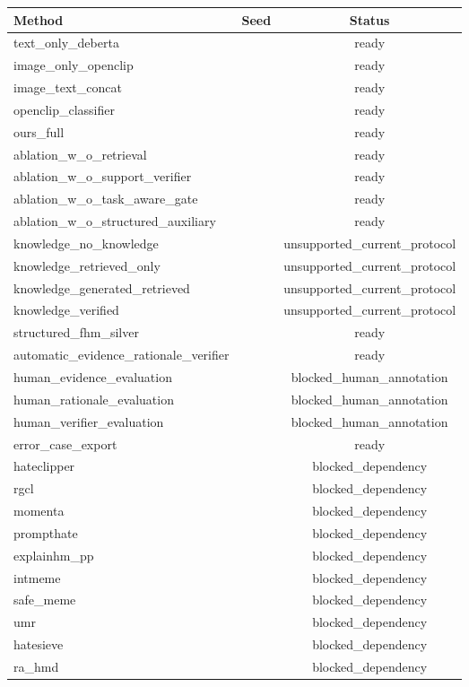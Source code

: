\begin{tabular}{lcc}
\toprule
Method & Seed & Status \\
\midrule
text\_only\_deberta &  & ready \\
image\_only\_openclip &  & ready \\
image\_text\_concat &  & ready \\
openclip\_classifier &  & ready \\
ours\_full &  & ready \\
ablation\_w\_o\_retrieval &  & ready \\
ablation\_w\_o\_support\_verifier &  & ready \\
ablation\_w\_o\_task\_aware\_gate &  & ready \\
ablation\_w\_o\_structured\_auxiliary &  & ready \\
knowledge\_no\_knowledge &  & unsupported\_current\_protocol \\
knowledge\_retrieved\_only &  & unsupported\_current\_protocol \\
knowledge\_generated\_retrieved &  & unsupported\_current\_protocol \\
knowledge\_verified &  & unsupported\_current\_protocol \\
structured\_fhm\_silver &  & ready \\
automatic\_evidence\_rationale\_verifier &  & ready \\
human\_evidence\_evaluation &  & blocked\_human\_annotation \\
human\_rationale\_evaluation &  & blocked\_human\_annotation \\
human\_verifier\_evaluation &  & blocked\_human\_annotation \\
error\_case\_export &  & ready \\
hateclipper &  & blocked\_dependency \\
rgcl &  & blocked\_dependency \\
momenta &  & blocked\_dependency \\
prompthate &  & blocked\_dependency \\
explainhm\_pp &  & blocked\_dependency \\
intmeme &  & blocked\_dependency \\
safe\_meme &  & blocked\_dependency \\
umr &  & blocked\_dependency \\
hatesieve &  & blocked\_dependency \\
ra\_hmd &  & blocked\_dependency \\

\end{tabular}
